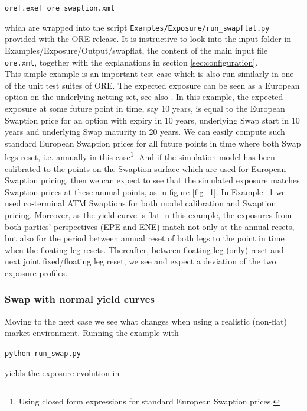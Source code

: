 \centerline{\tt ore[.exe] ore\_swaption.xml} 
\medskip

which are wrapped into the script {\tt Examples/Exposure/run\_swapflat.py} provided with the ORE release.
It is instructive to look into the input folder in Examples/Exposure/Output/swapflat, the content of the main input file {\tt
  ore.xml}, together with the explanations in section \ref{sec:configuration}. \\

This simple example is an important test case which is also run similarly in one of the unit test suites of ORE. The
expected exposure can be seen as a European option on the underlying netting set, see also \cite{methods}.
In this example, the expected exposure at some future point in time, say 10 years, is equal to
the European Swaption price for an option with expiry in 10 years, underlying Swap start in 10 years and underlying Swap
maturity in 20 years. We can easily compute such standard European Swaption prices for all future points in time where
both Swap legs reset, i.e. annually in this case\footnote{Using closed form expressions for standard European Swaption
  prices.}. And if the simulation model has been calibrated to the points on the Swaption surface which are used for
European Swaption pricing, then we can expect to see that the simulated exposure matches Swaption prices at these annual
points, as in figure \ref{fig_1}.  In Example\_1 we used co-terminal ATM Swaptions for both model calibration and
Swaption pricing. Moreover, as the yield curve is flat in this example, the exposures from both parties'
perspectives (EPE and ENE) match not only at the annual resets, but also for the period between annual reset of both
legs to the point in time when the floating leg resets. Thereafter, between floating leg (only) reset and next joint
fixed/floating leg reset, we see and expect a deviation of the two exposure profiles.

\subsubsection{Swap with normal yield curves}\label{example:exposure_swap}

Moving to the next case we see what changes when using a realistic (non-flat) market
environment. Running the example with

\medskip
\centerline{\tt python run\_swap.py } 
\medskip

yields the exposure evolution in 

